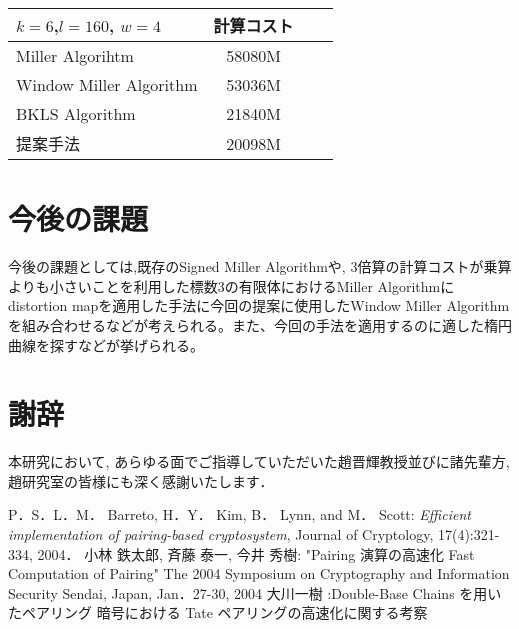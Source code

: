 \documentclass[twocolumn]{jsarticle} %
\begin{document}
\begin{table}[htbp]
 \begin{center}
  \begin{tabular}{|l|c|c|c|}
  \hline
  $k=6$,$l=160$, $w=4$ & 計算コスト \\
  \hline
  Miller Algorihtm & 58080M \\
  \hline
  Window Miller Algorithm & 53036M \\
  \hline
  BKLS Algorithm &  21840M \\
  \hline
  提案手法 & 20098M \\
  \hline
  \end{tabular}
 \end{center}
\end{table}
\section{今後の課題}
今後の課題としては,既存のSigned Miller Algorithmや, 3倍算の計算コストが乗算よりも小さいことを利用した標数3の有限体におけるMiller Algorithmにdistortion mapを適用した手法に今回の提案に使用したWindow Miller Algorithmを組み合わせるなどが考えられる。また、今回の手法を適用するのに適した楕円曲線を探すなどが挙げられる。
\section*{謝辞}
本研究において, あらゆる面でご指導していただいた趙晋輝教授並びに諸先輩方, 趙研究室の皆様にも深く感謝いたします．

\begin{thebibliography}{99}
 P．S．L．M． Barreto, H．Y． Kim, B． Lynn, and M． Scott: {\em Efficient implementation of pairing-based cryptosystem}, Journal of Cryptology, 17(4):321-334, 2004．
 小林 鉄太郎, 斉藤 泰一, 今井 秀樹: "Pairing 演算の高速化 Fast Computation of Pairing" The 2004 Symposium on Cryptography and Information Security Sendai, Japan, Jan．27-30, 2004
大川一樹 :Double-Base Chains を用いたペアリング 暗号における Tate ペアリングの高速化に関する考察

\end{thebibliography}

\end{document}
